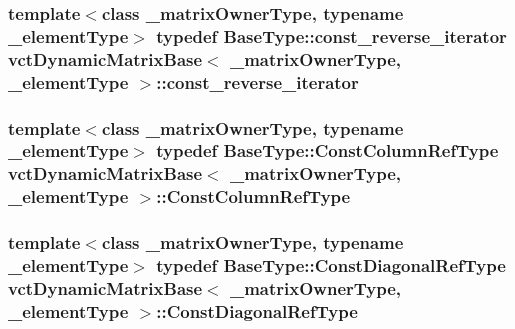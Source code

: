 \hypertarget{classvct_dynamic_matrix_base_a98a8a7626647cf9dfef10d6b7f7cc9af}{
\subsubsection[{const\-\_\-reverse\-\_\-iterator}]{\setlength{\rightskip}{0pt plus 5cm}template$<$class \-\_\-matrix\-Owner\-Type, typename \-\_\-element\-Type$>$ typedef {\bf Base\-Type\-::const\-\_\-reverse\-\_\-iterator} {\bf vct\-Dynamic\-Matrix\-Base}$<$ \-\_\-matrix\-Owner\-Type, \-\_\-element\-Type $>$\-::{\bf const\-\_\-reverse\-\_\-iterator}}}\label{classvct_dynamic_matrix_base_a98a8a7626647cf9dfef10d6b7f7cc9af}
\hypertarget{classvct_dynamic_matrix_base_a744dadc203a40ef15678bca262d09aad}{
\subsubsection[{Const\-Column\-Ref\-Type}]{\setlength{\rightskip}{0pt plus 5cm}template$<$class \-\_\-matrix\-Owner\-Type, typename \-\_\-element\-Type$>$ typedef {\bf Base\-Type\-::\-Const\-Column\-Ref\-Type} {\bf vct\-Dynamic\-Matrix\-Base}$<$ \-\_\-matrix\-Owner\-Type, \-\_\-element\-Type $>$\-::{\bf Const\-Column\-Ref\-Type}}}\label{classvct_dynamic_matrix_base_a744dadc203a40ef15678bca262d09aad}
\hypertarget{classvct_dynamic_matrix_base_ade45bdec8e92cad6e570939dc15d5450}{
\subsubsection[{Const\-Diagonal\-Ref\-Type}]{\setlength{\rightskip}{0pt plus 5cm}template$<$class \-\_\-matrix\-Owner\-Type, typename \-\_\-element\-Type$>$ typedef {\bf Base\-Type\-::\-Const\-Diagonal\-Ref\-Type} {\bf vct\-Dynamic\-Matrix\-Base}$<$ \-\_\-matrix\-Owner\-Type, \-\_\-element\-Type $>$\-::{\bf Const\-Diagonal\-Ref\-Type}}}\label{classvct_dynamic_matrix_base_ade45bdec8e92cad6e570939dc15d5450}
